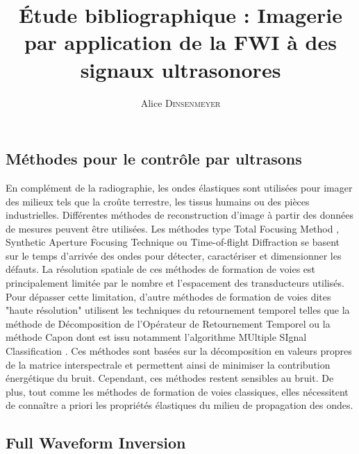 \documentclass[]{article}
\title{
\centering \fontsize{18pt}{10pt}\textbf{Étude bibliographique : Imagerie par application de la FWI à des signaux ultrasonores}
}
\author{
\large{Alice \textsc{Dinsenmeyer}}\\[2mm] %
\vspace{-5mm}
}
\date{}
\begin{document}
\maketitle %

\thispagestyle{fancy} %





\subsection*{Méthodes pour le contrôle par ultrasons}


En complément de la radiographie, les ondes élastiques sont utilisées pour imager des milieux tels que la croûte terrestre, les tissus humains ou des pièces industrielles. Différentes méthodes de reconstruction d'image à partir des données de mesures peuvent être utilisées. Les méthodes type Total Focusing Method \citep{holmes_tfm}, Synthetic Aperture Focusing Technique \citep{bruss_84} ou Time-of-flight Diffraction \citep{silk} se basent sur le temps d'arrivée des ondes pour détecter, caractériser et dimensionner les défauts. La résolution spatiale de ces méthodes de formation de voies est principalement limitée par le nombre et l'espacement des transducteurs utilisés. \\ 


Pour dépasser cette limitation, d'autre méthodes de formation de voies dites "haute résolution" utilisent les techniques du retournement temporel telles que la méthode de Décomposition de l'Opérateur de Retournement Temporel \citep{prada_dort} ou la méthode Capon \citep{capon} dont est issu notamment l'algorithme MUltiple SIgnal Classification \citep{schmidt}. Ces méthodes sont basées sur la décomposition en valeurs propres de la matrice interspectrale et permettent ainsi de minimiser la contribution énergétique du bruit. Cependant, ces méthodes restent sensibles au bruit. De plus, tout comme les méthodes de formation de voies classiques, elles nécessitent de connaître a priori les propriétés élastiques du milieu de propagation des ondes.

 


\subsection*{Full Waveform Inversion}
\end{document}
